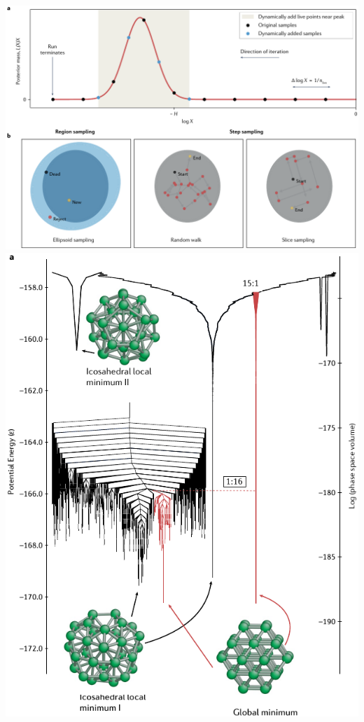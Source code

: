 \documentclass[aspectratio=169,handout]{beamer}
\begin{document}
\begin{frame}
\begin{columns}
        \includegraphics[width=\textwidth]{figures/nature2}
        \includegraphics[width=\textwidth]{figures/nature4}

\end{columns}
\end{frame}
\end{document}
